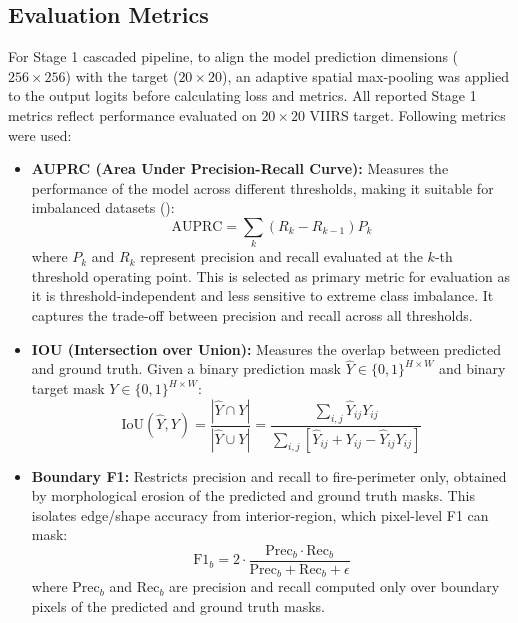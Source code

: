 \documentclass[a4paper, 11pt]{article} %
\begin{document}
\subsection{Evaluation Metrics}

For Stage 1 cascaded pipeline, to align the model prediction dimensions ($256 \times 256$) with the target ($20 \times 20$), an adaptive spatial max-pooling was applied to the output logits before calculating loss and metrics. All reported Stage 1 metrics reflect performance evaluated on $20 \times 20$ VIIRS target. Following metrics were used:

\begin{itemize}
    \item \textbf{AUPRC (Area Under Precision-Recall Curve):} Measures the performance of the model across different thresholds, making it suitable for imbalanced datasets (\cite{davisRelationshipPrecisionRecallROC2006}):
    \begin{equation}\label{eq:auprc}
        \text{AUPRC} = \sum_{k} (R_k - R_{k-1}) P_k
    \end{equation}
    where $P_k$ and $R_k$ represent precision and recall evaluated at the $k$-th threshold operating point. This is selected as primary metric for evaluation as it is threshold-independent and less sensitive to extreme class imbalance. It captures the trade-off between precision and recall across all thresholds.

    \item \textbf{IOU (Intersection over Union):} Measures the overlap between predicted and ground truth. Given a binary prediction mask $\hat{Y} \in \{0,1\}^{H\times W}$ and binary target mask $Y \in \{0,1\}^{H\times W}$:
    \begin{equation}
        \text{IoU}(\hat{Y}, Y) = \frac{|\hat{Y} \cap Y|}{|\hat{Y} \cup Y|}
        = \frac{\sum_{i,j} \hat{Y}_{ij} Y_{ij}}
            {\sum_{i,j} \left[ \hat{Y}_{ij} + Y_{ij} - \hat{Y}_{ij} Y_{ij} \right]}
        \label{eq:iou}
    \end{equation}

    \item \textbf{Boundary F1:} Restricts precision and recall to fire-perimeter only, obtained by morphological erosion of the predicted and ground truth masks. This isolates edge/shape accuracy from interior-region, which pixel-level F1 can mask:
    \begin{equation}\label{eq:boundary_f1}
        \text{F1}_b = 2 \cdot \frac{\text{Prec}_b \cdot \text{Rec}_b}{\text{Prec}_b + \text{Rec}_b + \epsilon}
    \end{equation}
    where $\text{Prec}_b$ and $\text{Rec}_b$ are precision and recall computed only over boundary pixels of the predicted and ground truth masks.


\end{itemize}
\end{document}
